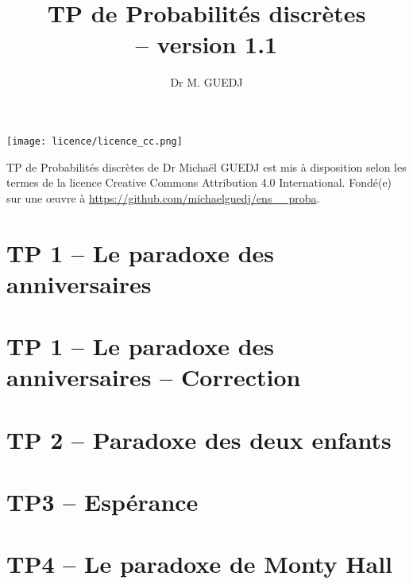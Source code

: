 \documentclass[11pt]{article} %
\title{TP de Probabilités discrètes\\ -- version 1.1}
\date{\vspace{-5ex}}
\author{Dr M. GUEDJ}
\begin{document}
\maketitle

\renewcommand{\contentsname}{Table des Matières}
\maketitle

\newpage
\begin{center}
	\texttt{[image: licence/licence\_cc.png]}
	
	\begin{small}
TP de Probabilités discrètes de Dr Michaël GUEDJ est mis à disposition selon les termes de la licence Creative Commons Attribution 4.0 International.
Fondé(e) sur une œuvre à 
		\url{https://github.com/michaelguedj/ens__proba}.
	\end{small}
\end{center}
\newpage

\tableofcontents

\section{TP 1 -- Le paradoxe des anniversaires}

\newpage
\section{TP 1 -- Le paradoxe des anniversaires -- Correction}


\newpage
\section{TP 2 -- Paradoxe des deux enfants}


\newpage
\section{TP3 -- Espérance}


\newpage
\section{TP4 -- Le paradoxe de Monty Hall}

\end{document}
